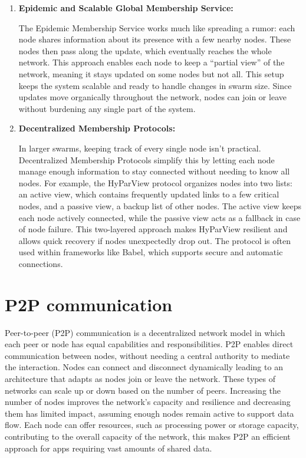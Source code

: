 \begin{enumerate}
  \item \textbf{Epidemic and Scalable Global Membership Service:}
  
  The Epidemic Membership Service works much like spreading a rumor: each node shares information about its presence with a few nearby nodes. These nodes then pass along the update, which eventually reaches the whole network. This approach enables each node to keep a “partial view” of the network, meaning it stays updated on some nodes but not all. This setup keeps the system scalable and ready to handle changes in swarm size. Since updates move organically throughout the network, nodes can join or leave without burdening any single part of the system.
  
  
  \item \textbf{Decentralized Membership Protocols:}
  
  In larger swarms, keeping track of every single node isn’t practical. Decentralized Membership Protocols simplify this by letting each node manage enough information to stay connected without needing to know all nodes. For example, the HyParView protocol organizes nodes into two lists: an active view, which contains frequently updated links to a few critical nodes, and a passive view, a backup list of other nodes. The active view keeps each node actively connected, while the passive view acts as a fallback in case of node failure. This two-layered approach makes HyParView resilient and allows quick recovery if nodes unexpectedly drop out. The protocol is often used within frameworks like Babel, which supports secure and automatic connections. 
     
  

\end{enumerate}

\section{P2P communication}
\label{sec:p2p_communication}

Peer-to-peer (P2P) communication is a decentralized network model in which each peer or node has equal capabilities and responsibilities. P2P enables direct communication between nodes, without needing a central authority to mediate the interaction.
  Nodes can connect and disconnect dynamically leading to an architecture that adapts as nodes join or leave the network. 
  These types of networks can scale up or down based on the number of peers. Increasing the number of nodes improves the network's capacity and resilience and decreasing them has limited impact, assuming enough nodes remain active to support data flow. Each node can offer resources, such as processing power or storage capacity, contributing to the overall capacity of the network, this makes P2P an efficient approach for apps requiring vast amounts of shared data.
  
